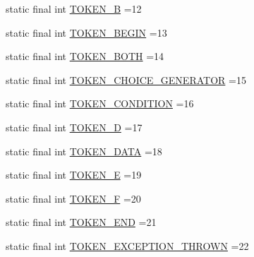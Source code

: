 \begin{DoxyCompactItemize}
\item 
static final int \hyperlink{classgov_1_1nasa_1_1jpf_1_1inspector_1_1server_1_1expression_1_1parser_1_1_expression_grammar_lexer_acdd3de3ed1a34fc382393736c0cb09a3}{T\+O\+K\+E\+N\+\_\+B} =12
\item 
static final int \hyperlink{classgov_1_1nasa_1_1jpf_1_1inspector_1_1server_1_1expression_1_1parser_1_1_expression_grammar_lexer_a3ac9f8114961a687b88da5cb08d19b9c}{T\+O\+K\+E\+N\+\_\+\+B\+E\+G\+IN} =13
\item 
static final int \hyperlink{classgov_1_1nasa_1_1jpf_1_1inspector_1_1server_1_1expression_1_1parser_1_1_expression_grammar_lexer_a1c676da485b1d0de0391921790262c96}{T\+O\+K\+E\+N\+\_\+\+B\+O\+TH} =14
\item 
static final int \hyperlink{classgov_1_1nasa_1_1jpf_1_1inspector_1_1server_1_1expression_1_1parser_1_1_expression_grammar_lexer_afd07542f0f4a30943e6dfe7b176214e6}{T\+O\+K\+E\+N\+\_\+\+C\+H\+O\+I\+C\+E\+\_\+\+G\+E\+N\+E\+R\+A\+T\+OR} =15
\item 
static final int \hyperlink{classgov_1_1nasa_1_1jpf_1_1inspector_1_1server_1_1expression_1_1parser_1_1_expression_grammar_lexer_afcf3d4671c4cb7351043e6c4b899ef59}{T\+O\+K\+E\+N\+\_\+\+C\+O\+N\+D\+I\+T\+I\+ON} =16
\item 
static final int \hyperlink{classgov_1_1nasa_1_1jpf_1_1inspector_1_1server_1_1expression_1_1parser_1_1_expression_grammar_lexer_a1a251f15b3394286beed7beef565db30}{T\+O\+K\+E\+N\+\_\+D} =17
\item 
static final int \hyperlink{classgov_1_1nasa_1_1jpf_1_1inspector_1_1server_1_1expression_1_1parser_1_1_expression_grammar_lexer_a4f7bc2b7cd4c744ea3577690b30723dd}{T\+O\+K\+E\+N\+\_\+\+D\+A\+TA} =18
\item 
static final int \hyperlink{classgov_1_1nasa_1_1jpf_1_1inspector_1_1server_1_1expression_1_1parser_1_1_expression_grammar_lexer_ad6a44d2543fed16b1e9ec5484ff249d7}{T\+O\+K\+E\+N\+\_\+E} =19
\item 
static final int \hyperlink{classgov_1_1nasa_1_1jpf_1_1inspector_1_1server_1_1expression_1_1parser_1_1_expression_grammar_lexer_a48cf4d0a07f97a76e2843af915baf74c}{T\+O\+K\+E\+N\+\_\+F} =20
\item 
static final int \hyperlink{classgov_1_1nasa_1_1jpf_1_1inspector_1_1server_1_1expression_1_1parser_1_1_expression_grammar_lexer_a5ec52b1abd77cfe9967f88559386f202}{T\+O\+K\+E\+N\+\_\+\+E\+ND} =21
\item 
static final int \hyperlink{classgov_1_1nasa_1_1jpf_1_1inspector_1_1server_1_1expression_1_1parser_1_1_expression_grammar_lexer_a4b66b636aa85831c5b6af972b76f3d8f}{T\+O\+K\+E\+N\+\_\+\+E\+X\+C\+E\+P\+T\+I\+O\+N\+\_\+\+T\+H\+R\+O\+WN} =22

\end{DoxyCompactItemize}

